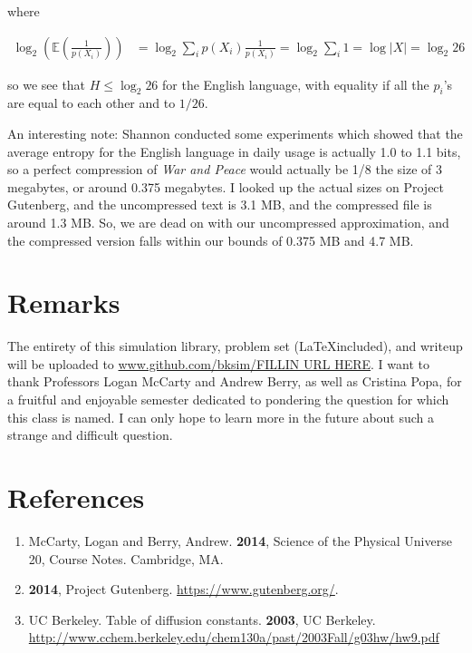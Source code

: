 \documentclass[12pt]{article}
\newcommand{\E}{\mathbb{E}}
\begin{document}
\begin{enumerate}
where

\begin{align*}
\log_2\left(\E\left(\frac{1}{p(X_i)}\right)\right)  &= \log_2 \sum_i p(X_i) \frac{1}{p(X_i)} = \log_2\sum_i 1 = \log |X| = \log_2 26
\end{align*}

so we see that $H \leq \log_2 26$ for the English language, with equality if all the $p_i$'s are equal to each other and to $1/26$. 

An interesting note: Shannon conducted some experiments which showed that the average entropy for the English language in daily usage is actually 1.0 to 1.1 bits, so a perfect compression of \textit{War and Peace} would actually be 1/8 the size of 3 megabytes, or around 0.375 megabytes. I looked up the actual sizes on Project Gutenberg, and the uncompressed text is 3.1 MB, and the compressed file is around 1.3 MB. So, we are dead on with our uncompressed approximation, and the compressed version falls within our bounds of 0.375 MB and 4.7 MB. 
\end{enumerate}


\section{Remarks}
The entirety of this simulation library, problem set (\LaTeX included), and writeup will be uploaded to \url{www.github.com/bksim/FILLIN URL HERE}. I want to thank Professors Logan McCarty and Andrew Berry, as well as Cristina Popa, for a fruitful and enjoyable semester dedicated to pondering the question for which this class is named. I can only hope to learn more in the future about such a strange and difficult question.

\section{References}
\begin{enumerate}
\item McCarty, Logan and Berry, Andrew. \textbf{2014}, Science of the Physical Universe 20, Course Notes. Cambridge, MA.
\item \textbf{2014}, Project Gutenberg. \url{https://www.gutenberg.org/}.
\item UC Berkeley. Table of diffusion constants. \textbf{2003}, UC Berkeley. \url{http://www.cchem.berkeley.edu/chem130a/past/2003Fall/g03hw/hw9.pdf}
\end{enumerate}
\end{document}

